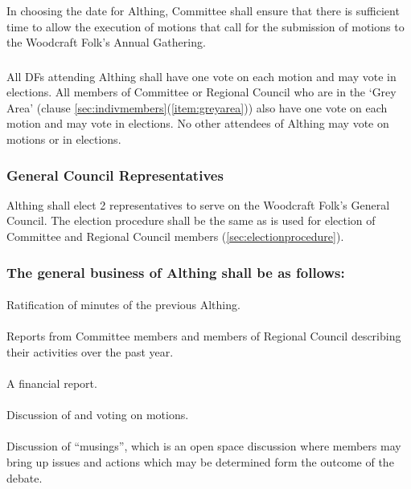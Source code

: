 \documentclass[a4paper, 12pt]{report}
\begin{document}
\subsubsection{}
In choosing the date for Althing, Committee shall ensure that there is sufficient time to allow the execution of motions that call for the submission of motions to the Woodcraft Folk's Annual Gathering.
\subsubsection{}
All DFs attending Althing shall have one vote on each motion and may vote in elections. All members of Committee or Regional Council who are in the `Grey Area' (clause \ref{sec:indivmembers}(\ref{item:greyarea})) also have one vote on each motion and may vote in elections. No other attendees of Althing may vote on motions or in elections.
\subsubsection{General Council Representatives}
Althing shall elect 2 representatives to serve on the Woodcraft Folk's General Council. The election procedure shall be the same as is used for election of Committee and Regional Council members (\ref{sec:electionprocedure}).
\subsubsection{The general business of Althing shall be as follows:}
\paragraph{}
Ratification of minutes of the previous Althing.
\paragraph{}
Reports from Committee members and members of Regional Council describing their activities over the past year.
\paragraph{}
A financial report.
\paragraph{}
Discussion of and voting on motions.
\paragraph{}
Discussion of ``musings'', which is an open space discussion where members may bring up issues and actions which may be determined form the outcome of the debate.
\end{document}
